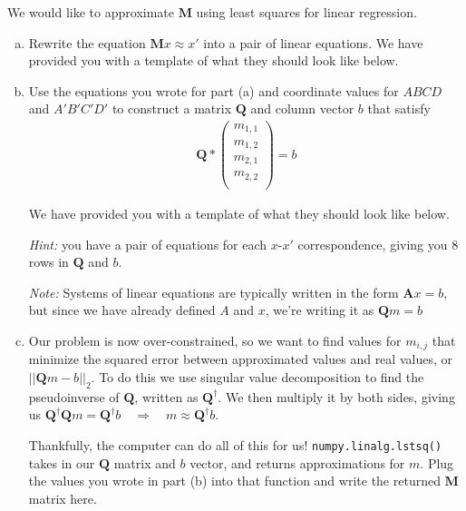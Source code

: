 We would like to approximate $\boldsymbol{M}$ using least squares for linear regression.

\begin{enumerate}[(a)]
    \item Rewrite the equation $\boldsymbol{M}x \approx x'$ into a pair of linear equations. We have provided you with a template of what they should look like below.

    \item Use the equations you wrote for part (a) and coordinate values for $ABCD$ and $A'B'C'D'$ to construct a matrix $\boldsymbol{Q}$ and column vector $b$ that satisfy
          \begin{align}
              \boldsymbol{Q}*\begin{pmatrix} m_{1,1} \\ m_{1,2} \\ m_{2,1} \\ m_{2,2} \\ \end{pmatrix} = b
          \end{align}

          We have provided you with a template of what they should look like below.

          \emph{Hint:} you have a pair of equations for each $x$-$x'$ correspondence, giving you $8$ rows in $\boldsymbol{Q}$ and $b$.

          \emph{Note:} Systems of linear equations are typically written in the form $\boldsymbol{A}x=b$, but since we have already defined $A$ and $x$, we're writing it as $\boldsymbol{Q}m=b$

    \item Our problem is now over-constrained, so we want to find values for $m_{i,j}$ that minimize the squared error between approximated values and real values, or $||\boldsymbol{Q}m-b||_2$. To do this we use singular value decomposition to find the pseudoinverse of $\boldsymbol{Q}$, written as $\boldsymbol{Q}^\dagger$. We then multiply it by both sides, giving us $\boldsymbol{Q}^\dagger \boldsymbol{Q}m = \boldsymbol{Q}^\dagger b \quad\Rightarrow\quad m \approx \boldsymbol{Q}^\dagger b$.

          Thankfully, the computer can do all of this for us! \texttt{numpy.linalg.lstsq()} takes in our $\boldsymbol{Q}$ matrix and $b$ vector, and returns approximations for $m$. Plug the values you wrote in part (b) into that function and write the returned $\boldsymbol{M}$ matrix here.
\end{enumerate}

